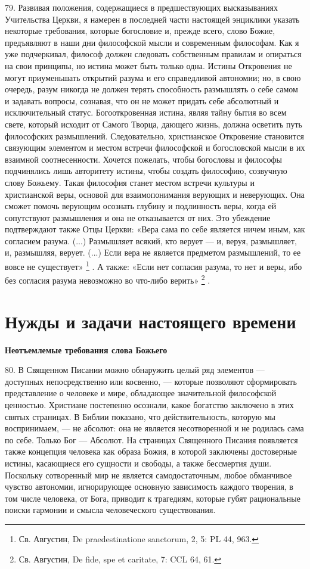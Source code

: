 \documentclass[a5paper,10pt]{article}
\begin{document}
79. Развивая положения, содержащиеся в предшествующих высказываниях Учительства
Церкви, я намерен в последней части настоящей энциклики указать некоторые
требования, которые богословие и, прежде всего, слово Божие, предъявляют в наши
дни философской мысли и современным философам. Как я уже подчеркивал, философ
должен следовать собственным правилам и опираться на свои принципы, но истина
может быть только одна. Истины Откровения не могут приуменьшать открытий разума
и его справедливой автономии; но, в свою очередь, разум никогда не должен
терять способность размышлять о себе самом и задавать вопросы, сознавая, что он
не может придать себе абсолютный и исключительный статус. Богооткровенная
истина, являя тайну бытия во всем свете, который исходит от Самого Творца,
дающего жизнь, должна осветить путь философских размышлений. Следовательно,
христианское Откровение становится связующим элементом и местом встречи
философской и богословской мысли в их взаимной соотнесенности. Хочется
пожелать, чтобы богословы и философы подчинялись лишь авторитету истины, чтобы
создать философию, созвучную слову Божьему. Такая философия станет местом
встречи культуры и христианской веры, основой для взаимопонимания верующих и
неверующих. Она сможет помочь верующим осознать глубину и подлинность веры,
когда ей сопутствуют размышления и она не отказывается от них. Это убеждение
подтверждают также Отцы Церкви: «Вера сама по себе является ничем иным, как
согласием разума. (...) Размышляет всякий, кто верует — и, веруя, размышляет,
и, размышляя, верует. (...) Если вера не является предметом размышлений, то ее
вовсе не существует» \footnote{Св. Августин, De praedestinatione sanctorum, 2,
5: PL 44, 963.} . А также: «Если нет согласия разума, то нет и веры, ибо без
согласия разума невозможно во что-либо верить» \footnote{Св. Августин, De fide,
spe et caritate, 7: CCL 64, 61.} .

\section{Нужды и задачи настоящего времени}

\textbf{Неотъемлемые требования слова Божьего}

80. В Священном Писании можно обнаружить целый ряд элементов — доступных
непосредственно или косвенно, — которые позволяют сформировать представление о
человеке и мире, обладающее значительной философской ценностью. Христиане
постепенно осознали, какое богатство заключено в этих святых страницах. В
Библии показано, что действительность, которую мы воспринимаем, — не абсолют:
она не является несотворенной и не родилась сама по себе. Только Бог — Абсолют.
На страницах Священного Писания появляется также концепция человека как образа
Божия, в которой заключены достоверные истины, касающиеся его сущности и
свободы, а также бессмертия души. Поскольку сотворенный мир не является
самодостаточным, любое обманчивое чувство автономии, игнорирующее основную
зависимость каждого творения, в том числе человека, от Бога, приводит к
трагедиям, которые губят рациональные поиски гармонии и смысла человеческого
существования.
\end{document}
